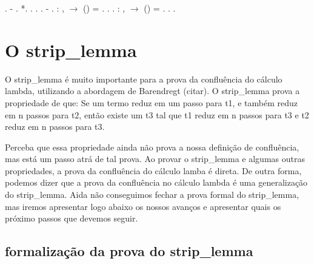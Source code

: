 \begin{coqdoccode}
\coqdocindent{2.00em}
 .\coqdoceol
\coqdocindent{1.00em}
-     .\coqdoceol
\coqdocindent{2.00em}
  *.\coqdoceol
\coqdocindent{2.00em}
   .\coqdoceol
\coqdocindent{2.00em}
 .\coqdoceol
\coqdocindent{2.00em}
 .\coqdoceol
\coqdocindent{1.00em}
- \coqdoceol
\coqdocindent{1.00em}
.\coqdoceol
\coqdocemptyline
\coqdocnoindent
{} : \coqdockw{\ensuremath{\forall}} ,   \ensuremath{\rightarrow} () = .\coqdoceol
\coqdocnoindent
{}.\coqdoceol
\coqdocindent{1.00em}
.\coqdoceol
\coqdocemptyline
\coqdocnoindent
{} : \coqdockw{\ensuremath{\forall}} ,   \ensuremath{\rightarrow} () = .\coqdoceol
\coqdocnoindent
{}.\coqdoceol
\coqdocindent{1.00em}
.\coqdoceol
\coqdocemptyline
\coqdocemptyline
\coqdocemptyline
\end{coqdoccode}
\section{O strip\_lemma}



 O strip\_lemma é muito importante para a prova da confluência do cálculo lambda, utilizando
a abordagem de Barendregt (citar). O strip\_lemma prova a propriedade de que: Se um termo reduz em um
passo para t1, e também reduz em n passos para t2, então existe um t3 tal que t1 reduz em n passos para t3
e t2 reduz em n passos para t3. 

 Perceba que essa propriedade ainda não prova a nossa definição de confluência, mas está um passo
atrá de tal prova. Ao provar o strip\_lemma e algumas outras propriedades, a prova da confluência do cálculo
lamba é direta. De outra forma, podemos dizer que a prova da confluência no cálculo lambda é uma 
generalização do strip\_lemma. Aida não conseguimos fechar a prova formal do strip\_lemma, mas iremos
apresentar logo abaixo os nossos avanços e apresentar quais os próximo passos que devemos seguir.

\subsection{formalização da prova do strip\_lemma}



